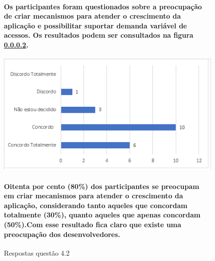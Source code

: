 \begin{figure}[!t]
\centering
\paragraph{Os participantes foram questionados sobre a preocupação de  criar mecanismos para atender o crescimento da aplicação e possibilitar suportar demanda variável de acessos. Os resultados podem ser consultados na figura \ref{fig:4.2}.}

\includegraphics[scale=0.7]{figuras das questoes/4.2.png}
\caption{Respostas questão 4.2}
\paragraph{Oitenta por cento (80{\%}) dos participantes se preocupam em criar mecanismos para atender o crescimento da aplicação, considerando tanto aqueles que concordam totalmente (30{\%}), quanto aqueles que apenas concordam (50{\%}).Com esse resultado fica claro que existe uma preocupação dos desenvolvedores.}
\label{fig:4.2}
\end{figure}
